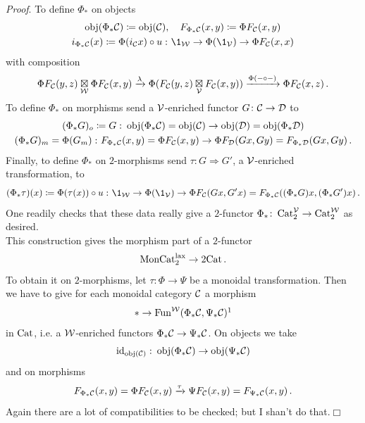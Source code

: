         \emph{Proof}. To define $\Phi_{*}$ on objects
        \begin{gather*}
            \obj(\Phi_{*} \Cc) \coloneq \obj(\Cc), \quad F_{\Phi_{*} \Cc}(x, y) \coloneq \Phi F_{\Cc}(x, y) \\
            i_{\Phi_{*} \Cc}(x) \coloneq \Phi(i_{\Cc} x) \circ u \,\colon \1_{\Ww} \to \Phi(\1_{\Vv}) \to \Phi F_{\Cc}(x, x)
        \end{gather*}
        with composition
        \begin{equation*}
            \Phi F_{\mathcal{C}}(y, z) \underset{\mathcal{W}}{\boxtimes} \Phi F_{\mathcal{C}}(x, y) \xrightarrow{\lambda} \Phi (F_{\mathcal{C}}(y, z) \underset{\mathcal{V}}{\boxtimes} F_{\mathcal{C}}(x, y)) \xrightarrow{\Phi(- \circ -)} \Phi F_{\mathcal{C}}(x, z) \,.
        \end{equation*}
        To define $\Phi_{*}$ on morphisms send a $\mathcal{V}$-enriched functor $G \colon \mathcal{C} \to \mathcal{D}$ to
        \begin{gather*}
            (\Phi_{*} G)_o \coloneq G \,\colon \operatorname{obj}(\Phi_{*} \mathcal{C}) = \operatorname{obj}(\mathcal{C}) \to \operatorname{obj}(\mathcal{D}) = \operatorname{obj}(\Phi_{*} \mathcal{D}) \\
            (\Phi_{*} G)_m = \Phi(G_m) \,\colon F_{\Phi_{*} \mathcal{C}}(x, y) = \Phi F_{\mathcal{C}}(x, y) \to \Phi F_{\mathcal{D}}(G x, G y) = F_{\Phi_{*} \mathcal{D}}(G x, G y) \,.
        \end{gather*}
        Finally, to define $\Phi_{*}$ on $2$-morphisms send $\tau \colon G \Rightarrow G'$, a $\mathcal{V}$-enriched transformation, to
        \begin{equation*}
            (\Phi_{*} \tau)(x) \coloneq \Phi(\tau(x)) \circ u \,\colon \1_{\Ww} \to \Phi(\1_{\Vv}) \to \Phi F_{\Cc}(G x, G' x) = F_{\Phi_{*} \Cc}((\Phi_{*} G) x, (\Phi_{*} G') x) \,.
        \end{equation*}
        One readily checks that these data really give a $2$-functor $\Phi_{*} \colon \operatorname{Cat}^{\mathcal{V}}_2 \to \operatorname{Cat}^{\mathcal{W}}_2$ as desired.\\
        This construction gives the morphism part of a $2$-functor
        \begin{equation*}
            \operatorname{MonCat}^{\operatorname{lax}}_2 \to \mathrm{2Cat} \,.
        \end{equation*}
        To obtain it on $2$-morphisms, let $\tau \colon \Phi \to \Psi$ be a monoidal transformation. Then we have to give for each monoidal category $\mathcal{C}$ a morphism
        \begin{equation*}
            * \to \Fun^{\Ww}(\Phi_{*} \Cc, \Psi_{*} \Cc)\footnotemark
        \end{equation*}
        in $\operatorname{Cat}$, i.e. a $\mathcal{W}$-enriched functors $\Phi_{*} \mathcal{C} \to \Psi_{*} \mathcal{C}$. On objects we take
        \begin{equation*}
            \operatorname{id}_{\operatorname{obj}(\mathcal{C})} \,\colon \operatorname{obj}(\Phi_{*} \mathcal{C}) \to \operatorname{obj}(\Psi_{*} \mathcal{C}) 
        \end{equation*}
        and on morphisms
        \begin{equation*}
            F_{\Phi_{*} \mathcal{C}}(x, y) = \Phi F_{\mathcal{C}}(x, y) \xrightarrow{\tau} \Psi F_{\mathcal{C}}(x, y) = F_{\Psi_{*} \mathcal{C}}(x, y) \,.
        \end{equation*}
        Again there are a lot of compatibilities to be checked; but I shan't do that.\hfill$\Box$

